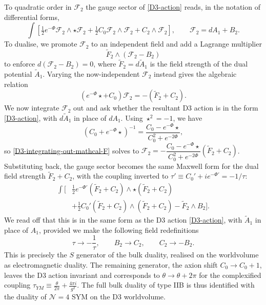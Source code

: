 To quadratic order in $\mathcal F_2$ the gauge sector of \eqref{D3-action} reads, in the notation of differential forms,
\begin{equation}
\int\left[\tfrac{1}{2}e^{-\Phi}\mathcal F_2\wedge\star\mathcal F_2+\tfrac{1}{2}C_0\mathcal F_2\wedge\mathcal F_2+C_2\wedge\mathcal F_2\right],\qquad \mathcal F_2 = dA_1+B_2.
\end{equation}
To dualise, we promote $\mathcal F_2$ to an independent field and add a Lagrange multiplier 
\begin{equation}
\tilde{F}_2 \wedge (\mathcal{F}_2 - B_2)
\end{equation}
to enforce $d(\mathcal F_2-B_2) = 0$, where $\tilde F_2 = d\tilde A_1$ is the field strength of the dual potential $\tilde A_1$.
Varying the now-independent $\mathcal F_2$ instead gives the algebraic relation
\begin{equation}
(e^{-\Phi}\star + C_0)\mathcal F_2 = -(\tilde F_2+C_2).
\label{D3-integrating-out-mathcal-F}
\end{equation}
We now integrate $\mathcal F_2$ out and ask whether the resultant D3 action is in the form \eqref{D3-action}, with $d\tilde A_1$ in place of $dA_1$. 
Using $\star^2=-1$, we have
\begin{equation}
(C_0+e^{-\Phi}\star)^{-1} = \frac{C_0-e^{-\Phi}\star}{C_0^2+e^{-2\Phi}},
\end{equation}
so \eqref{D3-integrating-out-mathcal-F} solves to $\mathcal F_2 = -\dfrac{C_0-e^{-\Phi}\star}{C_0^2+e^{-2\Phi}}(\tilde F_2+C_2)$. Substituting back, the gauge sector becomes the same Maxwell form for the dual field strength $\tilde F_2+C_2$, with the coupling inverted to $\tau'\equiv C_0'+ie^{-\Phi'}=-1/\tau$:
\begin{equation}
\begin{aligned}
\int\bigg[&\tfrac{1}{2}e^{-\Phi'}(\tilde F_2+C_2)\wedge\star(\tilde F_2+C_2)\\
&+\tfrac{1}{2}C_0'(\tilde F_2+C_2)\wedge(\tilde F_2+C_2)-\tilde F_2\wedge B_2\bigg].
\end{aligned}
\end{equation}
We read off that this is in the same form as the D3 action \eqref{D3-action}, with $\tilde A_1$ in place of $A_1$, provided we make the following field redefinitions
\begin{equation}
\tau\to-\frac{1}{\tau},\qquad
B_2 \to C_2,\qquad C_2\to -B_2.
\end{equation}
This is precisely the $S$ generator of the bulk \SLZ{} duality, realised on the worldvolume as electromagnetic duality.
The remaining generator, the axion shift $C_0\to C_0+1$, leaves the D3 action invariant and corresponds to $\theta\to \theta + 2\pi$ for the complexified coupling $\tau_{YM}\equiv \frac{\theta}{2\pi} + \frac{4\pi i}{g^2}$.
The full bulk \SLZ{} duality of type IIB is thus identified with the \SLZ{} duality of $\mathcal N=4$ SYM on the D3 worldvolume.


